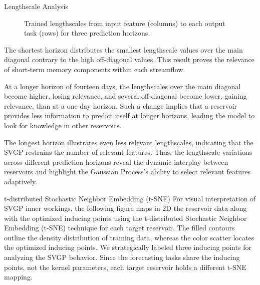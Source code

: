 \begin{frame}{Lengthscale Analysis}
	\begin{figure}[htbp]
		\centering
		\tiny
		\setlength{} 
		\setlength{}
		\subfloat[$H=1.$]{}\hspace{-1.3em}
		\subfloat[$H=14.$]{}\hspace{-1.3em}
		\subfloat[$H=30.$]{}
		\caption{Trained lengthscales from input feature (columns) to each output task (rows) for three prediction horizons.}
	\end{figure}
\end{frame}

\begin{frame}
	The shortest horizon distributes the smallest lengthscale values over the main diagonal contrary to the high off-diagonal values. This result proves the relevance of short-term memory components within each streamflow.
	
	At a longer horizon of fourteen days, the lengthscales over the main diagonal become higher, losing relevance, and several off-diagonal become lower, gaining relevance, than at a one-day horizon. Such a change implies that a reservoir provides less information to predict itself at longer horizons, leading the model to look for knowledge in other reservoirs.
	
	The longest horizon illustrates even less relevant lengthscales, indicating that the SVGP restrains the number of relevant features. Thus, the lengthscale variations across different prediction horizons reveal the dynamic interplay between reservoirs and highlight the Gaussian Process's ability to select relevant features adaptively.
	
\end{frame}

\begin{frame}{t-distributed Stochastic Neighbor Embedding (t-SNE)}
	For visual interpretation of SVGP inner workings, the following figure maps in 2D the reservoir data along with the optimized inducing points using the t-distributed Stochastic Neighbor Embedding (t-SNE) technique for each target reservoir. The filled contours outline the density distribution of training data, whereas the color scatter locates the optimized inducing points. We strategically labeled three inducing points for analyzing the SVGP behavior.
	Since the forecasting tasks share the inducing points, not the kernel parameters, each target reservoir holds a different t-SNE mapping.
	
\end{frame}

